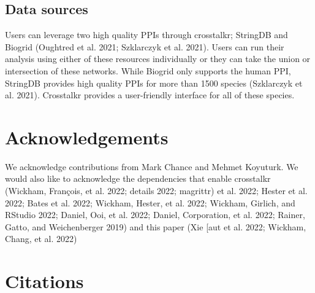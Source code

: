 \documentclass{article}
\begin{document}
\hypertarget{data-sources}{%
\subsection{Data sources}\label{data-sources}}

Users can leverage two high quality PPIs through crosstalkr; StringDB
and Biogrid (Oughtred et al. 2021; Szklarczyk et al. 2021). Users can
run their analysis using either of these resources individually or they
can take the union or intersection of these networks. While Biogrid only
supports the human PPI, StringDB provides high quality PPIs for more
than 1500 species (Szklarczyk et al. 2021). Crosstalkr provides a
user-friendly interface for all of these species.

\hypertarget{acknowledgements}{%
\section{Acknowledgements}\label{acknowledgements}}

We acknowledge contributions from Mark Chance and Mehmet Koyuturk. We
would also like to acknowledge the dependencies that enable crosstalkr
(Wickham, François, et al. 2022; details 2022; magrittr) et al. 2022;
Hester et al. 2022; Bates et al. 2022; Wickham, Hester, et al. 2022;
Wickham, Girlich, and RStudio 2022; Daniel, Ooi, et al. 2022; Daniel,
Corporation, et al. 2022; Rainer, Gatto, and Weichenberger 2019) and
this paper (Xie {[}aut et al. 2022; Wickham, Chang, et al. 2022)

\hypertarget{citations}{%
\section*{Citations}\label{citations}}
\end{document}
